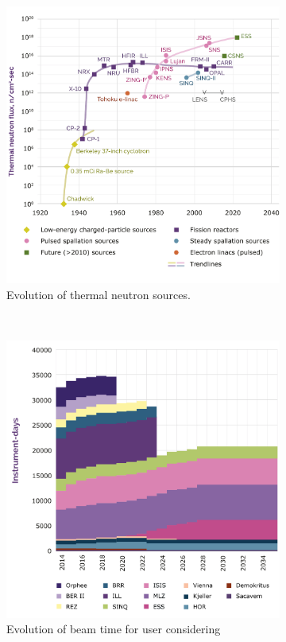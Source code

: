 \begin{figure}[!ht]
	\begin{subfigure}[t]{0.5\textwidth}
		\includegraphics[width=\textwidth]{01_Introduction/figures/fig000_NeutronSources_a}
		\caption{Evolution of thermal neutron sources.}
		\label{}
	\end{subfigure}
	~
	\begin{subfigure}[t]{0.5\textwidth}
		\includegraphics[width=\textwidth]{01_Introduction/figures/fig000_NeutronSources_b}
		\caption{Evolution of beam time for user considering }
		\label{}
	\end{subfigure}
	\caption[]{}
	\label{chap1:fig:NeutronSources}
\end{figure}
